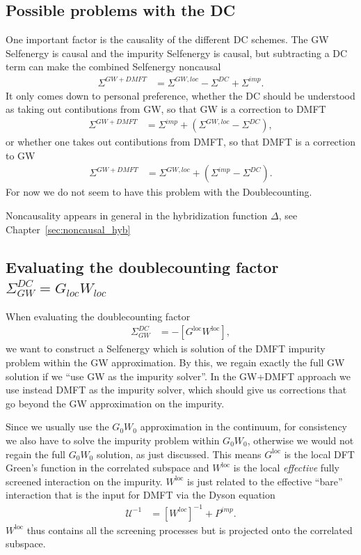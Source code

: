 \documentclass[12pt,a4paper]{scrartcl}
\numberwithin{equation}{section}
\begin{document}
\subsection{Possible problems with the DC}
One important factor is the causality of the different DC schemes.
The GW Selfenergy is causal and the impurity Selfenergy is causal,
but subtracting a DC term can make the combined Selfenergy noncausal
\begin{align}
\Sigma^{GW+DMFT} &= \Sigma^{GW,loc} - \Sigma^{DC} + \Sigma^{imp}.
\end{align}
It only comes down to personal preference, whether the DC should be understood
as taking out contibutions from GW, so that GW is a correction to DMFT
\begin{align}
\Sigma^{GW+DMFT} &=  \Sigma^{imp} + \left(\Sigma^{GW,loc} - \Sigma^{DC}\right) ,
\end{align}
or whether one takes out contibutions from DMFT, so that DMFT is a correction to GW
\begin{align}
\Sigma^{GW+DMFT} &=  \Sigma^{GW,loc} + \left(\Sigma^{imp} - \Sigma^{DC}\right) .
\end{align}
For now we do not seem to have this problem with the Doublecounting.

Noncausality appears in general in the hybridization function $\Delta$,
see Chapter~\ref{sec:noncausal_hyb}




\subsection{Evaluating the doublecounting factor $\Sigma^{DC}_{GW}=G_{loc}W_{loc}$}
\label{sec:glocwloc_dc_factor}
When evaluating the doublecounting factor 
\begin{align}
\Sigma^{DC}_{GW} &= -[G^{\mathrm{loc}}W^{\mathrm{loc}}],
\end{align}
we want to construct a Selfenergy which is solution
of the DMFT impurity problem within the GW approximation. 
By this, we regain exactly the full GW solution if we ``use GW
as the impurity solver''. In the GW+DMFT approach we use instead
DMFT as the impurity solver, which should give us corrections
that go beyond the GW approximation on the impurity.

Since we usually use the $G_0W_0$ approximation in the continuum,
for consistency we also have to solve the impurity problem within $G_0W_0$,
otherwise we would not regain the full $G_0W_0$ solution, as just discussed.
This means $G^{\mathrm{loc}}$ is the local DFT Green's function
in the correlated subspace and $W^{\mathrm{loc}}$ is the local 
\textit{effective} fully screened interaction on the impurity.
$W^{\mathrm{loc}}$ is just related to the effective ``bare'' interaction
that is the input for DMFT via the Dyson equation
\begin{align}
\mathcal{U}^{-1} &= [W^{loc} ]^{-1} + P^{imp}.
\end{align}
$W^{\mathrm{loc}}$ thus contains all the screening processes 
but is projected onto the correlated subspace.
\end{document}
